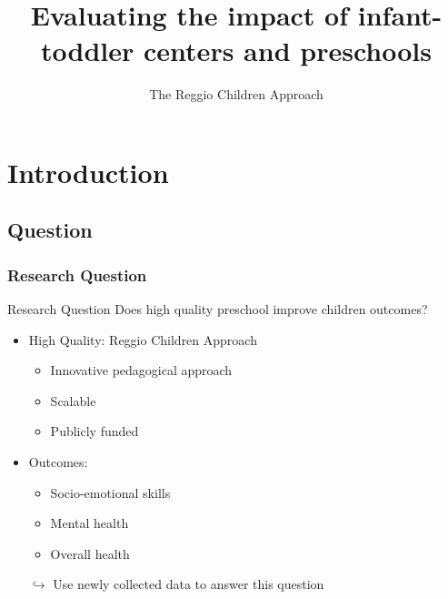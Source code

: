 \documentclass{beamer}
\title[Reggio Children Approach]{Evaluating the impact of infant-toddler centers and preschools}
\subtitle{The Reggio Children Approach}
\begin{document}
\maketitle


\section{Introduction}\label{sec:Intro}
\subsection{Question}\label{sec:question}
\begin{frame}
\frametitle{Research Question} 

\begin{block}{Research Question}
Does high quality preschool improve children outcomes?
\end{block}

\vspace{2ex}

\begin{itemize}
	\item High Quality: Reggio Children Approach
	\begin{itemize}
		\item Innovative pedagogical approach
		\item Scalable
		\item Publicly funded
	\end{itemize}
	\item Outcomes:
	\begin{itemize}
		\item Socio-emotional skills
		\item Mental health
		\item Overall health
	\end{itemize}

\vspace{4ex}

%

\item[$\hookrightarrow$] Use newly collected data to answer this question 
\end{itemize}


\end{frame} 
\end{document}
